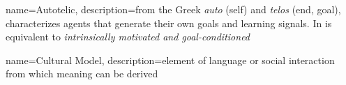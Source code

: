 \makeglossaries

{
    name=Autotelic,
    description={from the Greek \textit{auto} (self) and \textit{telos} (end, goal), characterizes agents that generate their own goals and learning signals. In is equivalent to \textit{intrinsically motivated and goal-conditioned}}
}

{
	name=Cultural Model,
	description={element of language or social interaction from which meaning can be derived}
}
